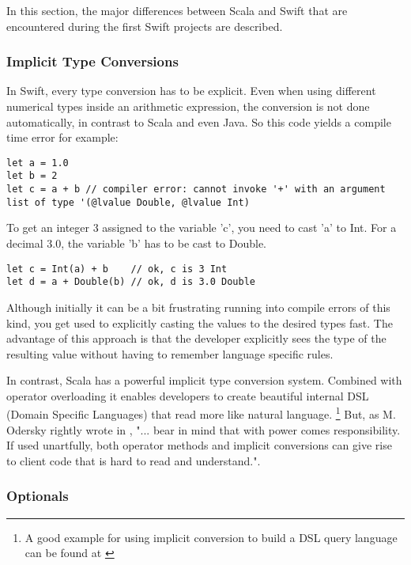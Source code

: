 In this section, the major differences between Scala and Swift that are encountered during the first Swift projects are described.

\subsubsection{Implicit Type Conversions}

In Swift, every type conversion has to be explicit. Even when using different numerical types inside an arithmetic expression, the conversion is not done automatically, in contrast to Scala and even Java. So this code yields a compile time error for example:

\begin{lstlisting}[frame=none]
let a = 1.0
let b = 2
let c = a + b // compiler error: cannot invoke '+' with an argument list of type '(@lvalue Double, @lvalue Int)
\end{lstlisting}

To get an integer 3 assigned to the variable 'c', you need to cast 'a' to Int. For a decimal 3.0, the variable 'b' has to be cast to Double.

\begin{lstlisting}[frame=none]
let c = Int(a) + b    // ok, c is 3 Int
let d = a + Double(b) // ok, d is 3.0 Double
\end{lstlisting}

Although initially it can be a bit frustrating running into compile errors of this kind, you get used to explicitly casting the values to the desired types fast. The advantage of this approach is that the developer explicitly sees the type of the resulting value without having to remember language specific rules.

In contrast, Scala has a powerful implicit type conversion system. Combined with operator overloading it enables developers to create beautiful internal DSL (Domain Specific Languages) that read more like natural language. \footnote{A good example for using implicit conversion to build a DSL query language can be found at \cite{scala-dsl-example}}
But, as M. Odersky rightly wrote in \cite[Chapter 6.13]{scala-book}, "... bear in mind that with power comes responsibility. If used unartfully, both operator methods and implicit conversions can give rise to client code that is hard to read and understand.".

\subsubsection{Optionals}

